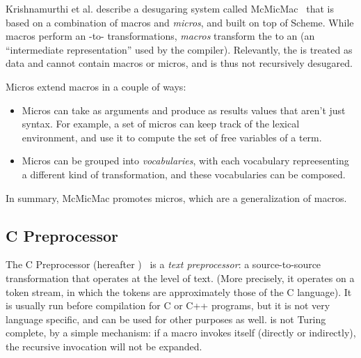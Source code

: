 Krishnamurthi et al. describe a desugaring system called
McMicMac~\cite{sk:mcmicmac} that is based on a combination of macros
and \emph{micros}, and built on top of Scheme. While macros perform an
-to- transformations, \emph{macros} transform the 
to an  (an ``intermediate representation'' used by the compiler).
Relevantly, the  is treated as data and cannot contain macros
or micros, and is thus not recursively desugared.

Micros extend macros in a couple of ways:
\begin{itemize}
  \item Micros can take as arguments and produce as results values
    that aren't just syntax. For example, a set of micros can keep
    track of the lexical environment, and use it to compute the set of
    free variables of a term.
  \item Micros can be grouped into \emph{vocabularies}, with each
    vocabulary repreesenting a different kind of transformation, and
    these vocabularies can be composed.
\end{itemize}

In summary, McMicMac promotes micros, which are a generalization of macros.


\subsection{C Preprocessor} \label{sec:taxonomy-cpre}

The C Preprocessor (hereafter )~\cite{cpp} is a \emph{text
  preprocessor}: a source-to-source transformation that operates at
the level of text. (More precisely, it operates on a token stream, in
which the tokens are approximately those of the C language). It is
usually run before compilation for C or C++ programs, but it is not
very language specific, and can be used for other purposes as well.
 is not Turing complete, by a simple mechanism: if a macro
invokes itself (directly or indirectly), the recursive invocation
will not be expanded.

